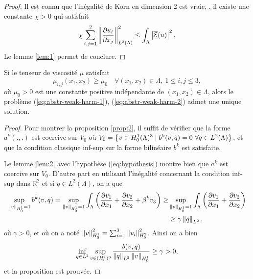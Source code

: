 \begin{proof}
Il est connu que l'inégalité de Korn en dimension 2 est vraie, \ie, il
existe une constante $\chi > 0$ qui satisfait
\begin{equation}
\chi\sum_{i,j = 1}^2 \left\lVert \frac{\partial u_i}{\partial
    x_j} \right\rVert^2_{L^2(\Lambda)} \leq \int_\Lambda \left\lvert \overline{\mathcal E}(u) \right\rvert^2.
\end{equation}
Le lemme \ref{lem:1} permet de conclure.
\end{proof}

\begin{proposition}\label{prop:2}
  Si le tenseur de viscosité $\mu$ satisfait
\begin{equation}
  \mu_{i,j}(x_1,x_2) \geq \mu_0\quad \forall (x_1, x_2)\in \Lambda,\ 1
  \leq i,j \leq 3,\label{eq:hypothesis}
\end{equation}
où $\mu_0 > 0$ est une constante positive indépendante de $(x_1,
x_2)\in \Lambda$, alors le problème (\ref{eq:abstr-weak-harm-1}),
(\ref{eq:abstr-weak-harm-2}) admet une unique solution.
\end{proposition}

\begin{proof}
  Pour montrer la proposition \ref{prop:2}, il suffit de vérifier
  que la forme $a^k(.,.)$ est coercive sur $V_0$ où $V_0 = \left\{ v
    \in H_0^1(\Lambda)^3\mid b^k(v, q) = 0\ \forall q \in
    L^2(\Lambda) \right\}$, et que la condition classique inf-sup sur la forme
  bilinéaire $b^k$ est satisfaite.

  Le lemme \ref{lem:2} avec l'hypothèse (\ref{eq:hypothesis}) montre
  bien que $a^k$ est coercive sur $V_0$. D'autre part en utilisant
  l'inégalité concernant la condition inf-sup dans $\mathbb R^2$ et si
  $q\in L^2(\Lambda)$, on a que
  \begin{align*}
    \sup_{\left\lVert v \right\rVert_{H^1_0} = 1} b^k(v,q)
    = \sup_{\left\lVert v \right\rVert_{H^1_0} = 1} \int_{\Lambda}\left( \frac{\partial v_1}{\partial x_1} + \frac{\partial v_2}{\partial x_2} + \beta^k v_3 \right)
    \geq & \sup_{\left\lVert v \right\rVert_{H^1_0} = 1}\int_{\Lambda}\left( \frac{\partial v_1}{\partial x_1} + \frac{\partial v_2}{\partial x_2} \right)\\
    &\geq \gamma \left\lVert q \right\rVert_{L^2},
  \end{align*}
  où $\gamma > 0$, et où on a noté $\left\lVert v \right\rVert_{H_0^1}^2 = \sum_{i =
    1}^3 \left\lVert v_i \right\rVert_{H_0^2}^2$. Ainsi on a bien
  \begin{equation}
    \inf_{q\in L^2}\sup_{v\in (H_0^1)^3} \frac{b(v,
      q)}{\left\lVert q \right\rVert_{L^2}\left\lVert v \right\rVert_{H^1_0}} \geq \gamma > 0,
  \end{equation}
  et la proposition est prouvée.
\end{proof}

